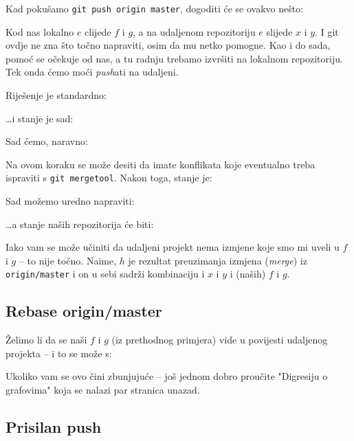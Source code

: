 Kad pokušamo \verb+git push origin master+, dogoditi će se ovakvo nešto:



Kod nas lokalno $e$ clijede $f$ i $g$, a na udaljenom repozitoriju $e$ slijede $x$ i $y$. 
I git ovdje ne zna što točno napraviti, osim da mu netko pomogne.
Kao i do sada, pomoć se očekuje od nas, a tu radnju trebamo izvršiti na lokalnom repozitoriju.
Tek onda ćemo moći \emph{push}ati na udaljeni.

Riješenje je standardno:


\dots{}i stanje je sad:



Sad ćemo, naravno:


Na ovom koraku se može desiti da imate konflikata koje eventualno treba ispraviti s \verb+git mergetool+.
Nakon toga, stanje je:



Sad možemo uredno napraviti:


\dots{}a stanje naših repozitorija će biti:



Iako vam se može učiniti da udaljeni projekt nema izmjene koje smo mi uveli u $f$ i $g$ -- to nije točno.
Naime, $h$ je rezultat preuzimanja izmjena (\emph{merge}) iz \verb+origin/master+ i on u sebi sadrži kombinaciju i $x$ i $y$ i (naših) $f$ i $g$.

\subsection*{Rebase origin/master}

Želimo li da se naši $f$ i $g$ (iz prethodnog primjera) vide u povijesti udaljenog projekta -- i to se može s:


Ukoliko vam se ovo čini zbunjujuće -- još jednom dobro proučite "Digresiju o grafovima" koja se nalazi par stranica unazad.

\subsection*{Prisilan push}

